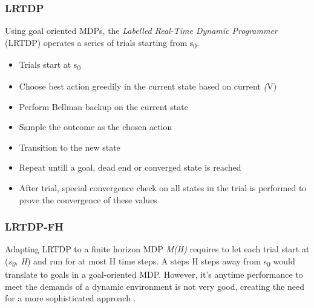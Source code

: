 \documentclass[runningheads,a4paper]{llncs}
\begin{document}
\subsubsection{LRTDP}
Using goal oriented MDPs, the \emph{Labelled Real-Time Dynamic Programmer} (LRTDP) operates a series of trials starting from s\textsubscript{0}. 
\begin{itemize}
	\item Trials start at s\textsubscript{0}
	\item Choose best action greedily in the current state based on current \emph(V)
	\item Perform  Bellman backup on the current state
	\item Sample the outcome as the chosen action
	\item Transition to the new state
	\item Repeat untill a goal, dead end or converged state is reached
	\item After trial, special convergence check on all states in the trial is performed to prove the convergence of these values
\end{itemize}

\subsubsection{LRTDP-FH}
Adapting LRTDP to a finite horizon MDP \emph{M(H)} requires to let each trial start at (\emph{s\textsubscript{0}, H}) and run for at most H time steps. A steps H steps away from s\textsubscript{0} would translate to goals in a goal-oriented MDP. However, it's anytime performance to meet the demands of a dynamic environment is not very good, creating the need for a more sophisticated approach \cite{kolobov2012glutton}.
\end{document}
